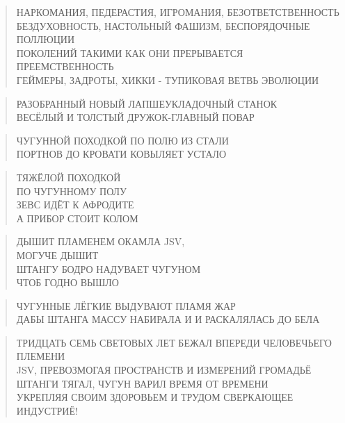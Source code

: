 \poemtitle{***}
\begin{verse}
НАРКОМАНИЯ, ПЕДЕРАСТИЯ, ИГРОМАНИЯ, БЕЗОТВЕТСТВЕННОСТЬ\\
БЕЗДУХОВНОСТЬ, НАСТОЛЬНЫЙ ФАШИЗМ, БЕСПОРЯДОЧНЫЕ ПОЛЛЮЦИИ\\
ПОКОЛЕНИЙ ТАКИМИ КАК ОНИ ПРЕРЫВАЕТСЯ ПРЕЕМСТВЕННОСТЬ\\
ГЕЙМЕРЫ, ЗАДРОТЫ, ХИККИ - ТУПИКОВАЯ ВЕТВЬ ЭВОЛЮЦИИ
\end{verse}

\poemtitle{***}
\begin{verse}
РАЗОБРАННЫЙ НОВЫЙ ЛАПШЕУКЛАДОЧНЫЙ СТАНОК\\
ВЕСЁЛЫЙ И ТОЛСТЫЙ ДРУЖОК-ГЛАВНЫЙ ПОВАР
\end{verse}

\poemtitle{***}
\begin{verse}
ЧУГУННОЙ ПОХОДКОЙ ПО ПОЛЮ ИЗ СТАЛИ\\
ПОРТНОВ ДО КРОВАТИ КОВЫЛЯЕТ УСТАЛО
\end{verse}

\poemtitle{***}
\begin{verse}
ТЯЖЁЛОЙ ПОХОДКОЙ\\
ПО ЧУГУННОМУ ПОЛУ\\
ЗЕВС ИДЁТ К АФРОДИТЕ\\
А ПРИБОР СТОИТ КОЛОМ
\end{verse}

\poemtitle{***}
\begin{verse}
ДЫШИТ ПЛАМЕНЕМ ОКАМЛА JSV, \\
    МОГУЧЕ ДЫШИТ\\
ШТАНГУ БОДРО НАДУВАЕТ ЧУГУНОМ\\
    ЧТОБ ГОДНО ВЫШЛО
\end{verse}

\poemtitle{***}
\begin{verse}
ЧУГУННЫЕ ЛЁГКИЕ ВЫДУВАЮТ ПЛАМЯ ЖАР\\
ДАБЫ ШТАНГА МАССУ НАБИРАЛА И И РАСКАЛЯЛАСЬ ДО БЕЛА
\end{verse}

\poemtitle{***}
\begin{verse}
ТРИДЦАТЬ СЕМЬ СВЕТОВЫХ ЛЕТ БЕЖАЛ ВПЕРЕДИ ЧЕЛОВЕЧЬЕГО ПЛЕМЕНИ\\
JSV, ПРЕВОЗМОГАЯ ПРОСТРАНСТВ И ИЗМЕРЕНИЙ ГРОМАДЬЁ\\
ШТАНГИ ТЯГАЛ, ЧУГУН ВАРИЛ ВРЕМЯ ОТ ВРЕМЕНИ\\
УКРЕПЛЯЯ СВОИМ ЗДОРОВЬЕМ И ТРУДОМ СВЕРКАЮЩЕЕ ИНДУСТРИЁ!
\end{verse}

